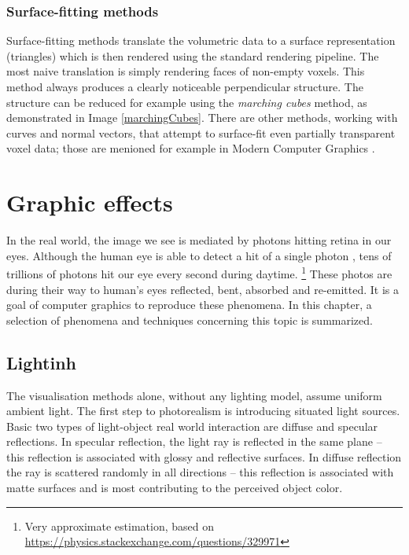 \subsection{Surface-fitting methods}
Surface-fitting methods translate the volumetric data to a surface representation (triangles) which is then rendered using the standard rendering pipeline. The most naive translation is simply rendering faces of non-empty voxels. This method always produces a clearly noticeable perpendicular structure. The structure can be reduced for example using the \textit{marching cubes} method, as demonstrated in Image \ref{marchingCubes}. There are other methods, working with curves and normal vectors, that attempt to surface-fit even partially transparent voxel data; those are menioned for example in Modern Computer Graphics \cite{ZaraJiri2004Mpg}.


\chapter{Graphic effects} \label{ch:graphicEffects}
In the real world, the image we see is mediated by photons hitting retina in our eyes. Although the human eye is able to detect a hit of a single photon \cite{TinsleyJonathan2016Ddoa}, tens of trillions of photons hit our eye every second during daytime. \footnote{Very approximate estimation, based on \url{https://physics.stackexchange.com/questions/329971}} These photos are during their way to human's eyes reflected, bent, absorbed and re-emitted. It is a goal of computer graphics to reproduce these phenomena. In this chapter, a selection of phenomena and techniques concerning this topic is summarized.

\section{Lightinh} \label{lighting}
The visualisation methods alone, without any lighting model, assume uniform ambient light. The first step to photorealism is introducing situated light sources. Basic two types of light-object real world interaction are diffuse and specular reflections. In specular reflection, the light ray is reflected in the same plane -- this reflection is associated with glossy and reflective surfaces. In diffuse reflection the ray is scattered randomly in all directions -- this reflection is associated with matte surfaces and is most contributing to the perceived object color.


